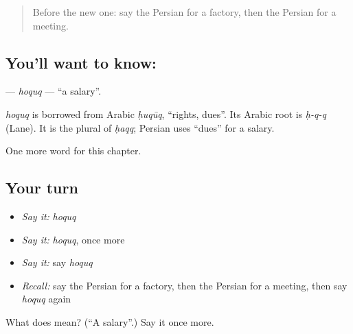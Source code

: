 \label{lesson:FA-C176-hoquq}



\begin{quote}
Before the new one: say the Persian for a factory, then the Persian for a meeting.
\end{quote}

\subsection*{You'll want to know: }
\textbf{} — \emph{hoquq} — \textquotedblleft{}a salary\textquotedblright{}.

\begin{cousinweb}
\emph{hoquq} is borrowed from Arabic \emph{ḥuqūq}, \textquotedblleft{}rights, dues\textquotedblright{}. Its Arabic root is \emph{ḥ-q-q} (Lane). It is the plural of \emph{ḥaqq}; Persian uses \textquotedblleft{}dues\textquotedblright{} for a salary.
\end{cousinweb}

\begin{grammarlens}[title={What you've built}]
One more word for this chapter.
\end{grammarlens}

\subsection*{Your turn}
\begin{itemize}
\raggedright
  \item \emph{Say it:} \emph{hoquq}
  \item \emph{Say it:} \emph{hoquq}, once more
  \item \emph{Say it:} say \emph{hoquq}
  \item \emph{Recall:} say the Persian for a factory, then the Persian for a meeting, then say \emph{hoquq} again
\end{itemize}

\begin{tcolorbox}[breakable,colback=teal!4,colframe=teal!35!black,title={Before you move on}]
What does  mean? (\textquotedblleft{}A salary\textquotedblright{}.) Say it once more.
\end{tcolorbox}
